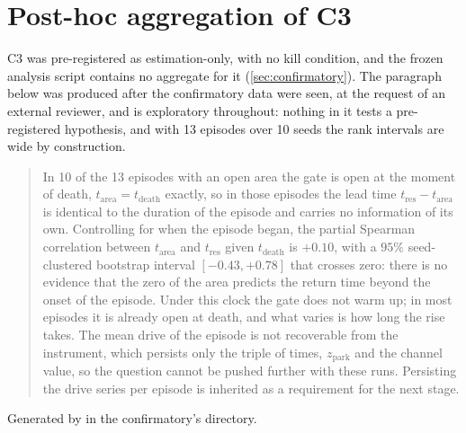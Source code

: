 \documentclass[11pt]{article}
\theoremstyle{definition}
\theoremstyle{remark}
\begin{document}
\section{Post-hoc aggregation of C3}\label{app:c3}

C3 was pre-registered as estimation-only, with no kill condition, and the
frozen analysis script contains no aggregate for it (\cref{sec:confirmatory}).
The paragraph below was produced after the confirmatory data were seen, at the
request of an external reviewer, and is exploratory throughout: nothing in it
tests a pre-registered hypothesis, and with 13 episodes over 10 seeds the rank
intervals are wide by construction.

\begin{quote}
In 10 of the 13 episodes with an open area the gate is open at the moment of
death, $t_{\mathrm{area}}=t_{\mathrm{death}}$ exactly, so in those episodes the
lead time $t_{\mathrm{res}}-t_{\mathrm{area}}$ is identical to the duration of
the episode and carries no information of its own. Controlling for when the
episode began, the partial Spearman correlation between $t_{\mathrm{area}}$ and
$t_{\mathrm{res}}$ given $t_{\mathrm{death}}$ is $+0.10$, with a $95\%$
seed-clustered bootstrap interval $[-0.43,+0.78]$ that crosses zero: there is no
evidence that the zero of the area predicts the return time beyond the onset of
the episode. Under this clock the gate does not warm up; in most episodes it is
already open at death, and what varies is how long the rise takes. The mean
drive of the episode is not recoverable from the instrument, which persists only
the triple of times, $z_{\mathrm{park}}$ and the channel value, so the question
cannot be pushed further with these runs. Persisting the drive series per
episode is inherited as a requirement for the next stage.
\end{quote}

\noindent Generated by  in the confirmatory's
directory.
\end{document}
